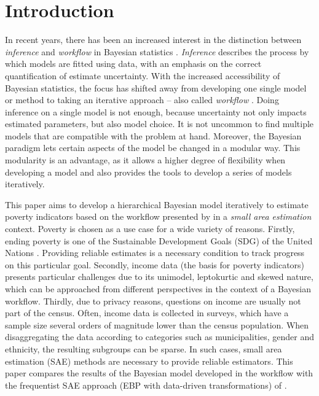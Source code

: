 \chapter{Introduction}

In recent years, there has been an increased interest in the distinction between \textit{inference} and \textit{workflow} in Bayesian statistics \citep{gelman_bayesian_2020}.
\textit{Inference} describes the process by which models are fitted using data, with an emphasis on the correct quantification of estimate uncertainty.
With the increased accessibility of Bayesian statistics, the focus has shifted away from developing one single model or method to taking an iterative approach – also called \textit{workflow} \citep{gelman_bayesian_2020}.
Doing inference on a single model is not enough, because uncertainty not only impacts estimated parameters, but also model choice.
It is not uncommon to find multiple models that are compatible with the problem at hand.
Moreover, the Bayesian paradigm lets certain aspects of the model be changed in a modular way.
This modularity is an advantage, as it allows a higher degree of flexibility when developing a model and also provides the tools to develop a series of models iteratively.

This paper aims to develop a hierarchical Bayesian model \citep{molina_small_2014}   iteratively to estimate poverty indicators \citep{foster_class_1984} based on the workflow presented by \cite{gelman_bayesian_2020} in a \textit{small area estimation} \citep{rao_small_2015} context.
Poverty is chosen as a use case for a wide variety of reasons.
Firstly, ending poverty is one of the Sustainable Development Goals (SDG) of the United Nations \citep{united_nations_transforming_2015}.
Providing reliable estimates is a necessary condition to track progress on this particular goal.
Secondly, income data (the basis for poverty indicators) presents particular challenges due to its unimodel, leptokurtic and skewed nature, which can be approached from different perspectives in the context of a Bayesian workflow.
Thirdly, due to privacy reasons, questions on income are usually not part of the census.
Often, income data is collected in surveys, which have a sample size several orders of magnitude lower than the census population.
When disaggregating the data according to categories such as municipalities, gender and ethnicity, the resulting subgroups can be sparse.
In such cases, small area estimation (SAE) methods are necessary to provide reliable estimators.
This paper compares the results of the Bayesian model developed in the workflow with the frequentist SAE approach (EBP with data-driven transformations) of \cite{rojas_perilla_data_2020}.

